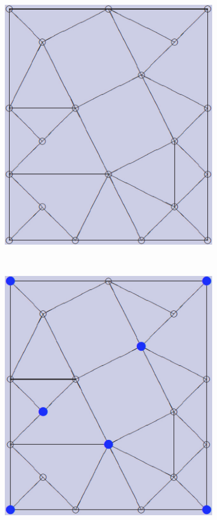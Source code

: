\documentclass[12pt]{article}
\begin{document}
\begin{figure}[tb]
\begin{subfigure}[b]{0.2\textwidth}
      \includegraphics[width=\textwidth]{img/contract_kernel6}
      \caption{}\label{fig:contract_kernel6}
  \end{subfigure}
  ~
  \begin{subfigure}[b]{0.2\textwidth}
      \includegraphics[width=\textwidth]{img/contract_kernel7}

\end{subfigure}
\end{figure}
\end{document}
